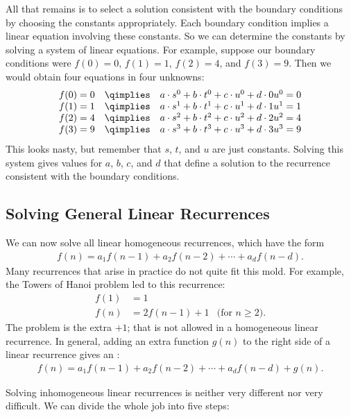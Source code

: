 All that remains is to select a solution consistent with the boundary
conditions by choosing the constants appropriately.  Each boundary
condition implies a linear equation involving these constants.  So we
can determine the constants by solving a system of linear
equations.  For example, suppose our boundary conditions were $f(0) =
0$, $f(1) = 1$, $f(2) = 4$, and $f(3) = 9$.  Then we would obtain four
equations in four unknowns:
\[
\begin{array}{r@{\quad\qimplies\quad}l}
f(0) = 0 & a \cdot s^0 + b \cdot t^0 + c \cdot u^0 + d \cdot 0u^0 = 0 \\
f(1) = 1 & a \cdot s^1 + b \cdot t^1 + c \cdot u^1 + d \cdot 1u^1 = 1 \\
f(2) = 4 & a \cdot s^2 + b \cdot t^2 + c \cdot u^2 + d \cdot 2u^2 = 4 \\
f(3) = 9 & a \cdot s^3 + b \cdot t^3 + c \cdot u^3 + d \cdot 3u^3 = 9
\end{array}
\]
This looks nasty, but remember that $s$, $t$, and $u$ are just
constants.  Solving this system gives values for $a$, $b$, $c$, and $d$
that define a solution to the recurrence consistent with the boundary
conditions.

\subsection{Solving General Linear Recurrences}

We can now solve all linear homogeneous recurrences, which have the
form
\begin{align*}
f(n) = a_1 f(n-1) + a_2 f(n-2) + \cdots + a_d f(n - d).
\end{align*}
Many recurrences that arise in practice do not quite fit this mold.
For example, the Towers of Hanoi problem led to this recurrence:
\begin{align*}
f(1) & = 1 \\
f(n) & = 2 f(n - 1) + 1 & \text{(for $n \geq 2$)}.
\end{align*}
The problem is the extra $+1$; that is not allowed in a homogeneous
linear recurrence.  In general, adding an extra function $g(n)$ to the
right side of a linear recurrence gives an :
\begin{align*}
f(n) = a_1 f(n-1) + a_2 f(n-2) + \cdots + a_d f(n - d) + g(n).
\end{align*}

Solving inhomogeneous linear recurrences is neither very different nor
very difficult.  We can divide the whole job into five steps:

